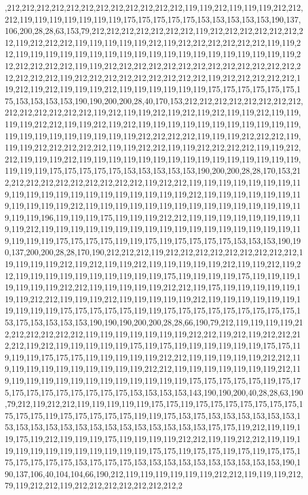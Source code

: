 ,212,212,212,212,212,212,212,212,212,212,212,212,119,119,212,119,119,119,212,212,212,119,119,119,119,119,119,119,175,175,175,175,175,153,153,153,153,153,190,137,106,200,28,28,63,153,79,212,212,212,212,212,212,212,119,212,212,212,212,212,212,212,119,212,212,212,119,119,119,119,119,212,119,212,212,212,212,212,212,119,119,212,119,119,119,119,119,119,119,119,119,119,119,119,119,119,119,119,119,119,119,212,212,212,212,212,119,119,212,212,212,212,212,212,212,212,212,212,212,212,212,212,212,212,212,119,212,212,212,212,212,212,212,212,212,119,212,212,212,212,212,119,212,119,212,119,119,119,212,119,119,119,119,119,119,175,175,175,175,175,175,175,153,153,153,153,190,190,200,200,28,40,170,153,212,212,212,212,212,212,212,212,212,212,212,212,212,212,119,212,119,119,212,119,212,119,212,119,119,212,119,119,119,119,212,212,119,119,212,119,212,119,119,119,119,119,119,119,119,119,119,119,119,119,119,119,119,119,119,119,119,212,212,212,212,119,119,119,212,212,212,119,119,119,212,212,212,212,212,119,119,212,212,119,119,212,212,212,212,119,119,212,212,119,119,119,212,119,119,119,119,119,119,119,119,119,119,119,119,119,119,119,119,119,119,175,175,175,175,175,153,153,153,153,153,190,200,200,28,28,170,153,212,212,212,212,212,212,212,212,212,212,119,212,212,119,119,119,119,119,119,119,119,119,119,119,119,119,119,119,119,119,119,119,119,212,119,119,119,119,119,119,119,119,119,119,119,212,119,119,119,119,119,119,119,119,119,119,119,119,119,119,119,119,119,196,119,119,119,175,119,119,119,212,212,119,119,119,119,119,119,119,119,119,212,119,119,119,119,119,119,119,119,119,119,119,119,119,119,119,119,119,119,119,119,119,175,175,175,175,119,119,175,119,175,175,175,175,153,153,153,190,190,137,200,200,28,28,170,190,212,212,212,119,212,212,212,212,212,212,212,212,212,119,119,119,119,212,119,212,119,119,212,119,119,119,119,119,212,119,119,212,119,212,119,119,119,119,119,119,119,119,119,119,175,119,119,119,119,175,119,119,119,119,119,119,119,212,212,119,119,119,119,119,212,212,119,175,119,119,119,119,119,119,119,212,212,119,119,119,212,119,119,119,119,119,212,119,119,119,119,119,119,119,119,119,119,175,175,175,175,175,119,119,175,175,175,175,175,175,175,175,175,153,175,153,153,153,153,190,190,190,200,200,28,28,66,190,79,212,119,119,119,119,212,212,212,212,212,212,119,119,119,119,119,119,119,212,212,119,212,119,212,212,212,212,119,212,119,119,119,119,119,175,119,175,119,119,119,119,119,119,175,175,119,119,119,175,175,175,119,119,119,119,119,212,212,119,119,119,119,119,212,212,119,119,119,119,119,119,119,119,119,119,212,212,119,119,119,119,119,119,119,212,119,119,119,119,119,119,119,119,119,119,119,119,119,175,175,175,175,175,119,175,175,175,175,175,175,175,175,175,175,153,153,153,153,143,190,190,200,40,28,28,63,190,79,212,119,212,212,119,119,119,119,119,175,175,119,175,175,175,175,175,175,175,175,175,175,119,175,175,175,175,175,119,119,175,153,175,153,153,153,153,153,153,153,153,153,153,153,153,153,153,153,153,153,153,153,153,175,175,119,212,119,119,119,175,119,212,119,119,119,175,119,119,119,119,212,212,119,119,212,212,119,119,119,119,119,119,119,119,119,119,119,119,175,175,119,175,175,119,175,119,175,175,175,175,175,175,175,153,175,175,175,153,153,153,153,153,153,153,153,153,153,190,190,137,106,40,104,104,66,190,212,119,119,119,119,119,119,212,212,119,119,119,212,79,119,212,212,119,212,212,212,212,212,212,212,2